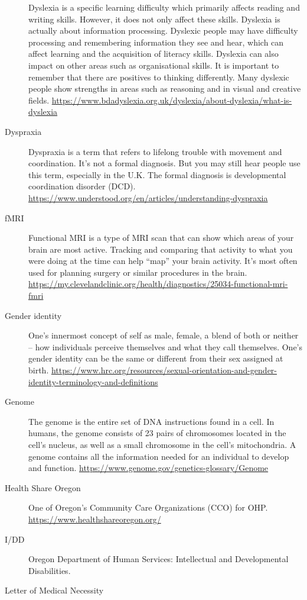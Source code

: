 \documentclass[
  letterpaper,
  DIV=11,
  numbers=noendperiod]{scrreprt}
\begin{document}
\begin{description}
Dyslexia is a specific learning difficulty which primarily affects
reading and writing skills. However, it does not only affect these
skills. Dyslexia is actually about information processing. Dyslexic
people may have difficulty processing and remembering information they
see and hear, which can affect learning and the acquisition of literacy
skills. Dyslexia can also impact on other areas such as organisational
skills. It is important to remember that there are positives to thinking
differently. Many dyslexic people show strengths in areas such as
reasoning and in visual and creative fields.
\url{https://www.bdadyslexia.org.uk/dyslexia/about-dyslexia/what-is-dyslexia}
\item[Dyspraxia]
Dyspraxia is a term that refers to lifelong trouble with movement and
coordination. It's not a formal diagnosis. But you may still hear people
use this term, especially in the U.K. The formal diagnosis is
developmental coordination disorder (DCD).
\url{https://www.understood.org/en/articles/understanding-dyspraxia}
\item[fMRI]
Functional MRI is a type of MRI scan that can show which areas of your
brain are most active. Tracking and comparing that activity to what you
were doing at the time can help ``map'' your brain activity. It's most
often used for planning surgery or similar procedures in the brain.
\url{https://my.clevelandclinic.org/health/diagnostics/25034-functional-mri-fmri}
\item[Gender identity]
One's innermost concept of self as male, female, a blend of both or
neither -- how individuals perceive themselves and what they call
themselves. One's gender identity can be the same or different from
their sex assigned at birth.
\url{https://www.hrc.org/resources/sexual-orientation-and-gender-identity-terminology-and-definitions}
\item[Genome]
The genome is the entire set of DNA instructions found in a cell. In
humans, the genome consists of 23 pairs of chromosomes located in the
cell's nucleus, as well as a small chromosome in the cell's
mitochondria. A genome contains all the information needed for an
individual to develop and function.
\url{https://www.genome.gov/genetics-glossary/Genome}
\item[Health Share Oregon]
One of Oregon's Community Care Organizations (CCO) for OHP.
\url{https://www.healthshareoregon.org/}
\item[I/DD]
Oregon Department of Human Services: Intellectual and Developmental
Disabilities.
\item[Letter of Medical Necessity]

\end{description}
\end{document}
